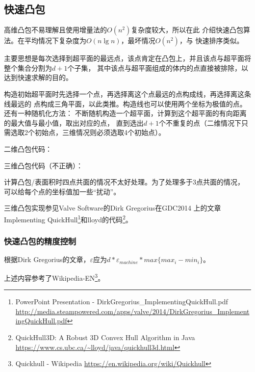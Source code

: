 \subsection{快速凸包}
高维凸包不易理解且使用增量法的$O(n^2)$复杂度较大，所以在此
介绍快速凸包算法。在平均情况下复杂度为$O(n\lg n)$，最坏情况$O(n^2)$，与
快速排序类似。

主要思想是每次选择到超平面的最远点，该点肯定在凸包上，并且该点与超平面将整个集合分割为$d+1$个子集，
其中该点与超平面组成的体内的点直接被排除，以达到快速求解的目的。

构造初始超平面时先选择一个点，再选择离这个点最远的点构成线，再选择离这条线最远的
点构成三角平面，以此类推。构造线也可以使用两个坐标为极值的点。还有一种随机化方法：
不断随机构造一个超平面，计算到这个超平面的有向距离的最大值与最小值，取出对应的点，
直到选出$d+1$个不重复的点（二维情况下只需选取2个初始点，三维情况则必须选取4个初始点）。

二维凸包代码：

三维凸包代码（不正确）：

计算凸包/表面积时四点共面的情况不太好处理。为了处理多于3点共面的情况，
可以给每个点的坐标值加一些``扰动''。


三维凸包实现参见Valve Software的Dirk Gregorius在GDC2014
上的文章Implementing QuickHull\footnote{
	PowerPoint Presentation - DirkGregorius\_ImplementingQuickHull.pdf\\
	\url{http://media.steampowered.com/apps/valve/2014/DirkGregorius\_ImplementingQuickHull.pdf}
}和lloyd的代码\footnote{
	QuickHull3D: A Robust 3D Convex Hull Algorithm in Java\\
	\url{https://www.cs.ubc.ca/\~lloyd/java/quickhull3d.html}
}。

\subsubsection{快速凸包的精度控制}
根据Dirk Gregorius的文章，$\varepsilon$应为$d*\varepsilon_{machine}*max\{max_i-min_i\}$。

上述内容参考了Wikipedia-EN\footnote{
	Quickhull - Wikipedia
	\url{https://en.wikipedia.org/wiki/Quickhull}
}。
